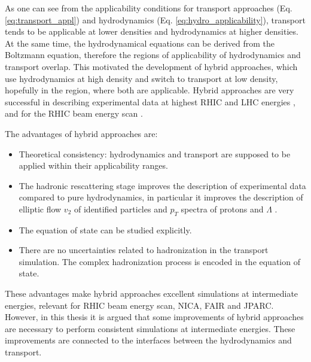 
As one can see from the applicability conditions for transport approaches (Eq.
\ref{eq:transport_appl}) and hydrodynamics (Eq. \ref{eq:hydro_applicability}),
transport tends to be applicable at lower densities and hydrodynamics at
higher densities. At the same time, the hydrodynamical equations can be derived
from the Boltzmann equation, therefore the regions of applicability of hydrodynamics
and transport overlap. 
This motivated the development of hybrid approaches, which use hydrodynamics at high
density and switch to transport at low density, hopefully in the region, where
both are applicable. Hybrid approaches are very successful in describing
experimental data at highest RHIC and LHC energies \cite{Bass:2000ib,Teaney:2001av,Hirano:2005xf,Nonaka:2006yn,Petersen:2008dd,Werner:2010aa,Song:2010mg,Karpenko:2012yf,Hirano:2012kj},
and for the RHIC beam energy scan \cite{Karpenko:2015xea,Auvinen:2016uuv}.

The advantages of hybrid approaches are:

\begin{itemize}
  \item Theoretical consistency: hydrodynamics and transport are supposed
        to be applied within their applicability ranges.
  \item The hadronic rescattering stage improves the description of experimental data
        compared to pure hydrodynamics, in particular it improves the description of
        elliptic flow $v_2$ of identified particles and
        $p_T$ spectra of protons and $\Lambda$ \cite{Petersen:2014yqa}.
  \item The equation of state can be studied explicitly.
  \item There are no uncertainties related to hadronization in the transport simulation.
        The complex hadronization process is encoded in the equation of state.
\end{itemize}

These advantages make hybrid approaches excellent simulations at intermediate
energies, relevant for RHIC beam energy scan, NICA, FAIR and JPARC. However, in
this thesis it is argued that some improvements of hybrid approaches are necessary
to perform consistent simulations at intermediate energies. These improvements
are connected to the interfaces between the hydrodynamics and transport.

